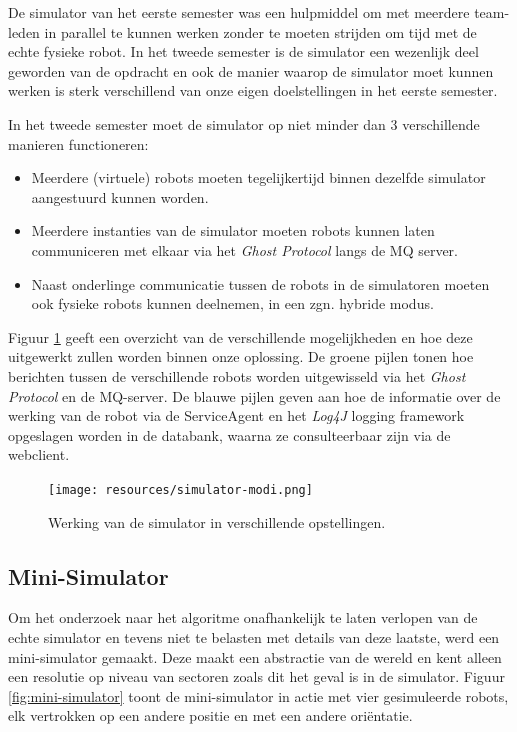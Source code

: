 \documentclass[12pt,a4paper]{report}
\begin{document}
De simulator van het eerste semester was een hulpmiddel om met meerdere team-leden in parallel te kunnen werken zonder te moeten strijden om tijd met de echte fysieke robot. In het tweede semester is de simulator een wezenlijk deel geworden van de opdracht en ook de manier waarop de simulator moet kunnen werken is sterk verschillend van onze eigen doelstellingen in het eerste semester.

In het tweede semester moet de simulator op niet minder dan 3 verschillende manieren functioneren:

\begin{itemize}
\item Meerdere (virtuele) robots moeten tegelijkertijd binnen dezelfde simulator aangestuurd kunnen worden.
\item Meerdere instanties van de simulator moeten robots kunnen laten communiceren met elkaar via het \emph{Ghost Protocol} langs de MQ server.
\item Naast onderlinge communicatie tussen de robots in de simulatoren moeten ook fysieke robots kunnen deelnemen, in een zgn. hybride modus.
\end{itemize}

Figuur \ref{fig:simulator-modi} geeft een overzicht van de verschillende mogelijkheden en hoe deze uitgewerkt zullen worden binnen onze oplossing. De groene pijlen tonen hoe berichten tussen de verschillende robots worden uitgewisseld via het \emph{Ghost Protocol} en de MQ-server. De blauwe pijlen geven aan hoe de informatie over de werking van de robot via de ServiceAgent en het \emph{Log4J} logging framework opgeslagen worden in de databank, waarna ze consulteerbaar zijn via de webclient.

\begin{figure}[htbp]
  \centering
  \texttt{[image: resources/simulator-modi.png]}
  \caption{Werking van de simulator in verschillende opstellingen.}
  \label{fig:simulator-modi}
\end{figure}

\subsection{Mini-Simulator}
\label{sect:mini-simulator}
Om het onderzoek naar het algoritme onafhankelijk te laten verlopen van de echte simulator en tevens niet te belasten met details van deze laatste, werd een mini-simulator gemaakt. Deze maakt een abstractie van de wereld en kent alleen een resolutie op niveau van sectoren zoals dit het geval is in de simulator. Figuur \ref{fig:mini-simulator} toont de mini-simulator in actie met vier gesimuleerde robots, elk vertrokken op een andere positie en met een andere ori\"entatie.
\end{document}
